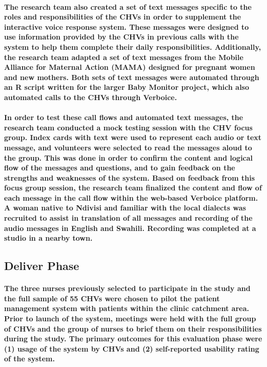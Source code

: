 \paragraph{The research team also created a set of text messages specific to the roles and responsibilities of the CHVs in order to supplement the interactive voice response system. These messages were designed to use information provided by the CHVs in previous calls with the system to help them complete their daily responsibilities. Additionally, the research team adapted a set of text messages from the Mobile Alliance for Maternal Action (MAMA) designed for pregnant women and new mothers. Both sets of text messages were automated through an R script written for the larger Baby Monitor project, which also automated calls to the CHVs through Verboice.}

\paragraph{In order to test these call flows and automated text messages, the research team conducted a mock testing session with the CHV focus group. Index cards with text were used to represent each audio or text message, and volunteers were selected to read the messages aloud to the group. This was done in order to confirm the content and logical flow of the messages and questions, and to gain feedback on the strengths and weaknesses of the system. Based on feedback from this focus group session, the research team finalized the content and flow of each message in the call flow within the web-based Verboice platform. A woman native to Ndivisi and familiar with the local dialects was recruited to assist in translation of all messages and recording of the audio messages in English and Swahili. Recording was completed at a studio in a nearby town.}


\subsection{Deliver Phase}
\paragraph{The three nurses previously selected to participate in the study and the full sample of 55 CHVs were chosen to pilot the patient management system with patients within the clinic catchment area. Prior to launch of the system, meetings were held with the full group of CHVs and the group of nurses to brief them on their responsibilities during the study. The primary outcomes for this evaluation phase were (1) usage of the system by CHVs and (2) self-reported usability rating of the system.}

